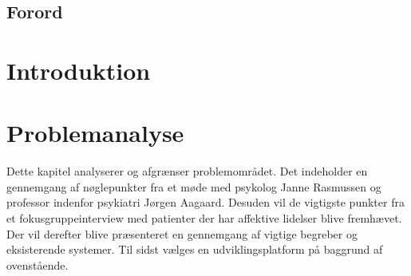 %
%
%
%
% 




\pagestyle{empty} %

%
\listoftodos
\cleardoublepage

\cleardoublepage

\section*{Forord}

\cleardoublepage

\pagestyle{fancy} %
\setcounter{tocdepth}{2}
\setcounter{secnumdepth}{3}
\tableofcontents

%
\cleardoublepage

\chapter*{Introduktion}


\chapter{Problemanalyse}
Dette kapitel analyserer og afgrænser problemområdet.
Det indeholder en gennemgang af nøglepunkter fra et møde med psykolog Janne Rasmussen og professor indenfor psykiatri Jørgen Aagaard.
Desuden vil de vigtigste punkter fra et fokusgruppeinterview med patienter der har affektive lidelser blive fremhævet.
Der vil derefter blive præsenteret en gennemgang af vigtige begreber og eksisterende systemer.
Til sidst vælges en udviklingsplatform på baggrund af ovenstående.

